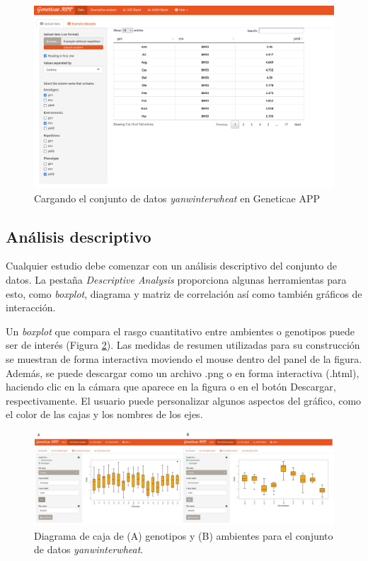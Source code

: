  \begin{figure}[H]
	\begin{center}
		\includegraphics[width=16cm]{./Graficos/www/Data.png}
	\end{center}
	\caption{Cargando el conjunto de datos \emph{yanwinterwheat} en Geneticae APP}
	\label{fig:fig431}
\end{figure}


\subsection{Análisis descriptivo}

Cualquier estudio debe comenzar con un análisis descriptivo del conjunto de datos. La pestaña \emph{Descriptive Analysis} proporciona algunas herramientas para esto, como  \emph{boxplot}, diagrama y matriz de correlación así como también gráficos de interacción.

Un \emph{boxplot} que compara el rasgo cuantitativo entre ambientes o genotipos puede ser de interés (Figura \ref{fig:figdesc1}). Las medidas de resumen utilizadas para su construcción se muestran de forma interactiva moviendo el mouse dentro del panel de la figura. Además, se puede descargar como un archivo .png o en forma interactiva (.html), haciendo clic en la cámara que aparece en la figura o en el botón Descargar, respectivamente. El usuario puede personalizar algunos aspectos del gráfico, como el color de las cajas y los nombres de los ejes. 

\begin{figure}[H]
	\begin{center}
		\includegraphics[width=16cm]{./Graficos/Boxplot.jpg}
	\end{center}
	\caption{Diagrama de caja de (A) genotipos y (B) ambientes para el conjunto de datos \emph{yanwinterwheat}.}
	\label{fig:figdesc1}
\end{figure}

